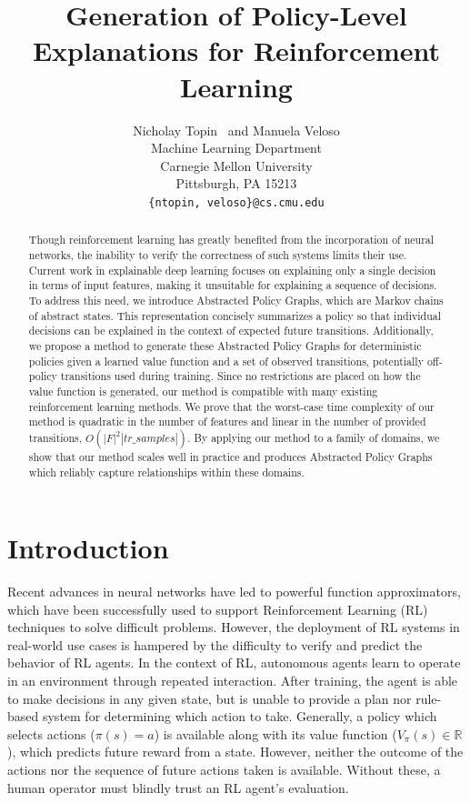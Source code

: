 \documentclass[letterpaper]{article} %
\begin{document}
\title{Generation of Policy-Level Explanations for Reinforcement Learning}
\author{
Nicholay Topin \ and Manuela Veloso \\
Machine Learning Department\\
Carnegie Mellon University\\
Pittsburgh, PA 15213 \\
\texttt{\{ntopin, veloso\}@cs.cmu.edu} \\
}
\maketitle
\begin{abstract}
Though reinforcement learning has greatly benefited from the incorporation of neural networks, the inability to verify the correctness of such systems limits their use.
Current work in explainable deep learning focuses on explaining only a single decision in terms of input features, making it unsuitable for explaining a sequence of decisions.
To address this need, we introduce Abstracted Policy Graphs, which are Markov chains of abstract states.
This representation concisely summarizes a policy so that individual decisions can be explained in the context of expected future transitions.
Additionally, we propose a method to generate these Abstracted Policy Graphs for deterministic policies given a learned value function and a set of observed transitions, potentially off-policy transitions used during training.
Since no restrictions are placed on how the value function is generated, our method is compatible with many existing reinforcement learning methods.
We prove that the worst-case time complexity of our method is quadratic in the number of features and linear in the number of provided transitions, $O(|F|^2 |tr\_samples|)$.
By applying our method to a family of domains, we show that our method scales well in practice and produces Abstracted Policy Graphs which reliably capture relationships within these domains.
\end{abstract}

\section{Introduction}
Recent advances in neural networks have led to powerful function approximators, which have been successfully used to support Reinforcement Learning (RL) techniques to solve difficult problems.
However, the deployment of RL systems in real-world use cases is hampered by the difficulty to verify and predict the behavior of RL agents.
In the context of RL, autonomous agents learn to operate in an environment through repeated interaction.
After training, the agent is able to make decisions in any given state, but is unable to provide a plan nor rule-based system for determining which action to take.
Generally, a policy  which selects actions ($\pi(s) = a$) is available along with its value function ($V_{\pi}(s) \in \mathbb{R}$), which predicts future reward from a state.
However, neither the outcome of the actions nor the sequence of future actions taken is available.
Without these, a human operator must blindly trust an RL agent's evaluation.
\end{document}

